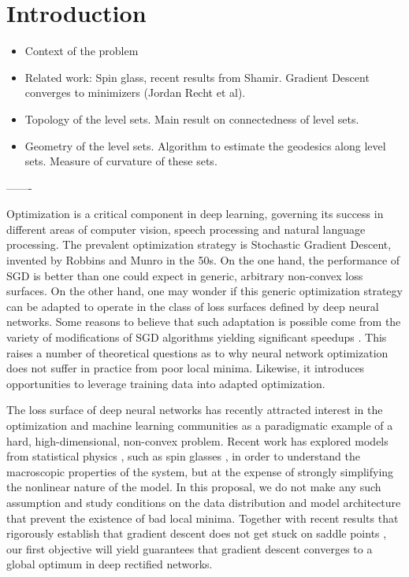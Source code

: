 \section{Introduction}
\label{sec:Intro}

\begin{itemize}
\item Context of the problem
\item Related work: Spin glass, recent results from Shamir. Gradient Descent converges to minimizers (Jordan Recht et al). 
\item Topology of the level sets. Main result on connectedness of level sets.
\item Geometry of the level sets. Algorithm to estimate the geodesics along level sets. Measure of curvature of these sets. 
\end{itemize}


------- 


Optimization is a critical component in deep learning, governing its success in different areas of computer vision, speech processing and natural language processing. The prevalent optimization strategy is Stochastic Gradient Descent, invented by Robbins and Munro in the 50s. On the one hand, the performance of SGD is better than one could expect 
in generic, arbitrary non-convex loss surfaces. On the other hand, one may wonder if this generic optimization strategy can be adapted to operate in the class of loss surfaces defined by deep neural networks. Some reasons to believe that such adaptation is possible come from the 
variety of modifications of SGD algorithms yielding significant speedups \cite{duchi2011adaptive, hinton2012lecture, ioffe2015batch, kingma2014adam}.
This raises a number of theoretical questions as to why neural network optimization does not suffer in practice from poor local minima. Likewise, it introduces opportunities to leverage training data into adapted optimization. 

The loss surface of deep neural networks has recently attracted interest 
in the optimization and machine learning communities as a paradigmatic example of 
a hard, high-dimensional, non-convex problem. 
Recent work has explored models from statistical physics \cite{dauphin2014identifying}, such as spin glasses \cite{choromanska2015loss}, 
in order to understand the macroscopic properties of the system, but at the expense of strongly simplifying the nonlinear nature of the model.
In this proposal, we do not make any such assumption and study conditions 
on the data distribution and model architecture that prevent the existence 
of bad local minima. Together with 
recent results that rigorously establish that gradient descent does not 
get stuck on saddle points \cite{lee2016gradient}, our first objective will yield guarantees that gradient descent converges
to a global optimum in deep rectified networks. 

